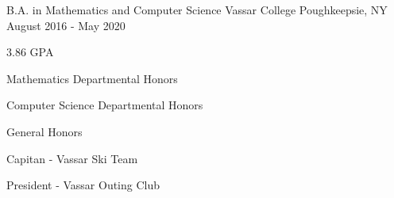 

\begin{cventries}

  \cventry
    {B.A. in Mathematics and Computer Science} %
    {Vassar College} %
    {Poughkeepsie, NY} %
    {August 2016 - May 2020} %
    {
      \begin{cvitems} %
        \item {3.86 GPA}
        \item {Mathematics Departmental Honors}
        \item {Computer Science Departmental Honors}
        \item {General Honors}
        \item {Capitan - Vassar Ski Team}
        \item {President - Vassar Outing Club}
      \end{cvitems}
    }

\end{cventries}
